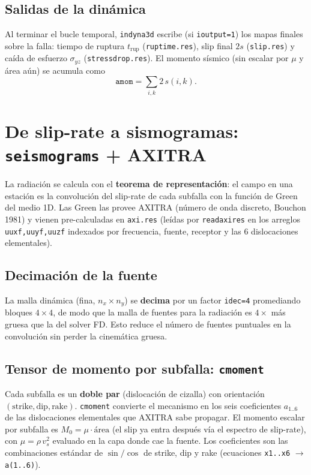 \documentclass[11pt,a4paper]{article}
\begin{document}
\subsection{Salidas de la dinámica}
Al terminar el bucle temporal, \texttt{indyna3d} escribe (si \texttt{ioutput=1})
los mapas finales sobre la falla: tiempo de ruptura $t_{\text{rup}}$
(\texttt{ruptime.res}), slip final $2s$ (\texttt{slip.res}) y caída de esfuerzo
$\sigma_{yz}$ (\texttt{stressdrop.res}). El momento sísmico (sin escalar por
$\mu$ y área aún) se acumula como
\begin{equation}
  \texttt{amom} = \sum_{i,k} 2\,s(i,k).
\end{equation}

\section{De slip-rate a sismogramas: \texttt{seismograms} + AXITRA}

La radiación se calcula con el \textbf{teorema de representación}: el campo en
una estación es la convolución del slip-rate de cada subfalla con la función de
Green del medio 1D. Las Green las provee AXITRA (número de onda discreto,
Bouchon 1981) y vienen pre-calculadas en \texttt{axi.res} (leídas por
\texttt{readaxires} en los arreglos \texttt{uuxf,uuyf,uuzf} indexados por
frecuencia, fuente, receptor y las 6 dislocaciones elementales).

\subsection{Decimación de la fuente}
La malla dinámica (fina, $n_x\times n_y$) se \textbf{decima} por un factor
\texttt{idec=4} promediando bloques $4\times4$, de modo que la malla de fuentes
para la radiación es $4\times$ más gruesa que la del solver FD. Esto reduce el
número de fuentes puntuales en la convolución sin perder la cinemática gruesa.

\subsection{Tensor de momento por subfalla: \texttt{cmoment}}
Cada subfalla es un \textbf{doble par} (dislocación de cizalla) con orientación
$(\text{strike},\text{dip},\text{rake})$. \texttt{cmoment} convierte el mecanismo
en los seis coeficientes $a_{1..6}$ de las dislocaciones elementales que AXITRA
sabe propagar. El momento escalar por subfalla es $M_0=\mu\cdot \text{área}$
(el slip ya entra después vía el espectro de slip-rate), con
$\mu=\rho\,v_s^2$ evaluado en la capa donde cae la fuente. Los coeficientes son
las combinaciones estándar de $\sin/\cos$ de strike, dip y rake (ecuaciones
\texttt{x1..x6} $\to$ \texttt{a(1..6)}).
\end{document}

